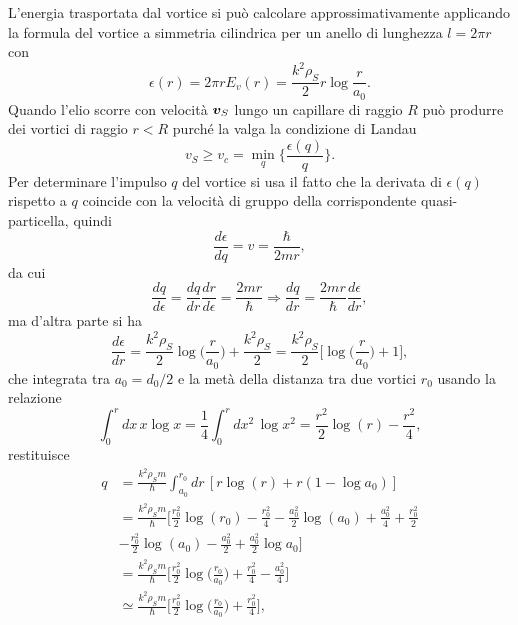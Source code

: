 L'energia trasportata dal vortice si può calcolare approssimativamente applicando la formula del vortice a simmetria cilindrica per un anello di lunghezza $l = 2\pi r$ con
\begin{equation}
    \epsilon(r) = 2\pi r E_v(r) = \frac{k^2\rho_S}{2}r\log{\frac{r}{a_0}}.
\end{equation}
Quando l'elio scorre con velocità $\bm{v}_S$ lungo un capillare di raggio $R$ può produrre dei vortici di raggio $r < R$ purché la valga la condizione di Landau
\begin{equation}
    v_S \ge v_c = \min_q\bigg\{\frac{\epsilon(q)}{q}\bigg\}.
\end{equation}
Per determinare l'impulso $q$ del vortice si usa il fatto che la derivata di $\epsilon(q)$ rispetto a $q$ coincide con la velocità di gruppo della corrispondente quasi-particella, quindi
\begin{equation}
    \frac{d\epsilon}{dq} = v = \frac{\hbar}{2mr},
\end{equation}
da cui 
\begin{equation}
    \frac{dq}{d\epsilon} = \frac{dq}{dr}\frac{dr}{d\epsilon} = \frac{2mr}{\hbar} \Rightarrow \frac{dq}{dr} = \frac{2mr}{\hbar}\frac{d\epsilon}{dr},
\end{equation}
ma d'altra parte si ha
\begin{equation}
    \frac{d\epsilon}{dr} = \frac{k^2\rho_S}{2}\log{\bigg(\frac{r}{a_0}\bigg)} + \frac{k^2\rho_S}{2} = \frac{k^2\rho_S}{2}\bigg[\log{\bigg(\frac{r}{a_0}\bigg)} + 1\bigg],
\end{equation}
che integrata tra $a_0 = d_0/2$ e la metà della distanza tra due vortici $r_0$ usando la relazione
\begin{equation}
    \int_0^r dx\,x\log{x} = \frac{1}{4}\int_0^r dx^2\,\log{x^2} = \frac{r^2}{2}\log{(r)} - \frac{r^2}{4},
\end{equation}
restituisce
\begin{equation}
    \begin{split}
        q &= \frac{k^2\rho_Sm}{\hbar}\int_{a_0}^{r_0}dr\,[r\log{(r)} + r(1 - \log{a_0})] \\
        &= \frac{k^2\rho_Sm}{\hbar}\bigg[\frac{r_0^2}{2}\log{(r_0)} - \frac{r_0^2}{4} - \frac{a_0^2}{2}\log{(a_0)} + \frac{a_0^2}{4} + \frac{r_0^2}{2} \\
        &- \frac{r_0^2}{2}\log{(a_0)} - \frac{a_0^2}{2} + \frac{a_0^2}{2}\log{a_0}\bigg] \\
        &= \frac{k^2\rho_Sm}{\hbar}\bigg[\frac{r_0^2}{2}\log{\bigg(\frac{r_0}{a_0}\bigg)} + \frac{r_0^2}{4} - \frac{a_0^2}{4}\bigg] \\
        &\simeq \frac{k^2\rho_Sm}{\hbar}\bigg[\frac{r_0^2}{2}\log{\bigg(\frac{r_0}{a_0}\bigg)} + \frac{r_0^2}{4}\bigg],
    \end{split}
\end{equation}
